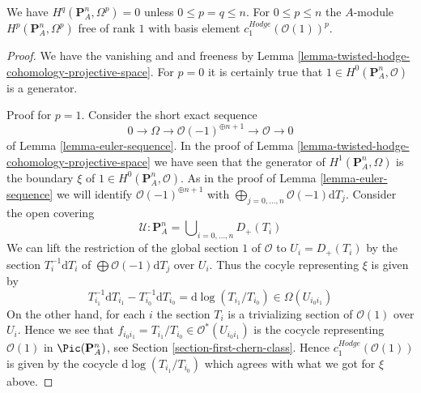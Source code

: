 \begin{lemma}
\label{lemma-hodge-cohomology-projective-space}
We have $H^q(\mathbf{P}^n_A, \Omega^p) = 0$
unless $0 \leq p = q \leq n$. For $0 \leq p \leq n$ the $A$-module
$H^p(\mathbf{P}^n_A, \Omega^p)$ free of rank $1$ with basis element
$c_1^{Hodge}(\mathcal{O}(1))^p$.
\end{lemma}

\begin{proof}
We have the vanishing and and freeness by
Lemma \ref{lemma-twisted-hodge-cohomology-projective-space}.
For $p = 0$ it is certainly true that
$1 \in H^0(\mathbf{P}^n_A, \mathcal{O})$ is a generator.

\medskip\noindent
Proof for $p = 1$. Consider the short exact sequence
$$
0 \to \Omega \to \mathcal{O}(-1)^{\oplus n + 1} \to \mathcal{O} \to 0
$$
of Lemma \ref{lemma-euler-sequence}. In the proof of
Lemma \ref{lemma-twisted-hodge-cohomology-projective-space}
we have seen that the generator of $H^1(\mathbf{P}^n_A, \Omega)$
is the boundary $\xi$ of $1 \in H^0(\mathbf{P}^n_A, \mathcal{O})$.
As in the proof of Lemma \ref{lemma-euler-sequence} we will identify
$\mathcal{O}(-1)^{\oplus n + 1}$ with
$\bigoplus_{j = 0, \ldots, n} \mathcal{O}(-1)\text{d}T_j$.
Consider the open covering
$$
\mathcal{U} : 
\mathbf{P}^n_A =
\bigcup\nolimits_{i = 0, \ldots, n} D_{+}(T_i)
$$
We can lift the restriction of the global section $1$ of $\mathcal{O}$
to $U_i = D_+(T_i)$ by the section $T_i^{-1} \text{d}T_i$ of
$\bigoplus \mathcal{O}(-1)\text{d}T_j$ over $U_i$. Thus the cocyle
representing $\xi$ is given by
$$
T_{i_1}^{-1} \text{d}T_{i_1} - T_{i_0}^{-1} \text{d}T_{i_0} =
\text{d}\log(T_{i_1}/T_{i_0}) \in \Omega(U_{i_0i_1})
$$
On the other hand, for each $i$ the section $T_i$ is a trivializing
section of $\mathcal{O}(1)$ over $U_i$. Hence we see that
$f_{i_0i_1} = T_{i_1}/T_{i_0} \in \mathcal{O}^*(U_{i_0i_1})$
is the cocycle representing $\mathcal{O}(1)$ in $\Pic(\mathbf{P}^n_A)$,
see Section \ref{section-first-chern-class}.
Hence $c_1^{Hodge}(\mathcal{O}(1))$
is given by the cocycle $\text{d}\log(T_{i_1}/T_{i_0})$
which agrees with what we got for $\xi$ above.


\end{proof}
